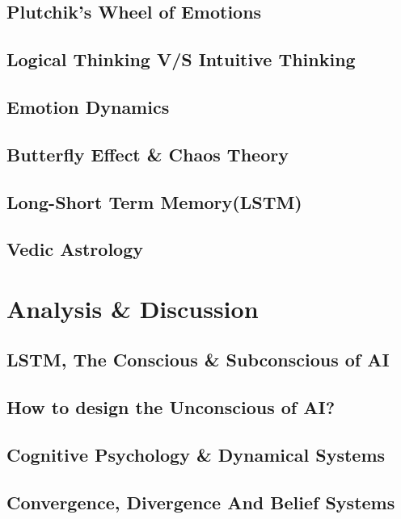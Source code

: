 \documentclass[12pt, a4paper]{article}
\begin{document}
\begin{multicols}{2}
		\subsection{Plutchik's Wheel of Emotions}
		
		\subsection{Logical Thinking V/S Intuitive Thinking}
		
		\subsection{Emotion Dynamics}
		
		\subsection{Butterfly Effect \& Chaos Theory}
		
		\subsection{Long-Short Term Memory(LSTM)}
		
		\subsection{Vedic Astrology}
		
		\section{Analysis \& Discussion}
		\subsection{LSTM, The Conscious \& Subconscious of AI}
		\subsection{How to design the Unconscious of AI?}
		\subsection{Cognitive Psychology \& Dynamical Systems}
		
		\subsection{Convergence, Divergence And Belief Systems}
		

\end{multicols}
\end{document}
